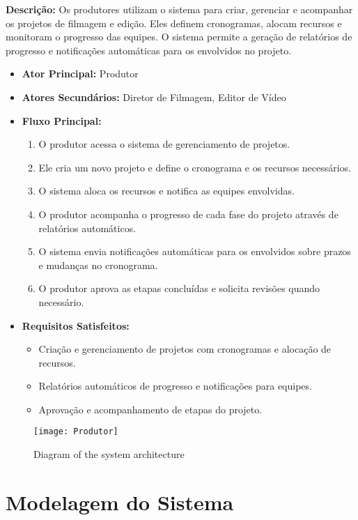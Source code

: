 \textbf{Descrição:} Os produtores utilizam o sistema para criar, gerenciar e acompanhar os projetos de filmagem e edição. Eles definem cronogramas, alocam recursos e monitoram o progresso das equipes. O sistema permite a geração de relatórios de progresso e notificações automáticas para os envolvidos no projeto.

\begin{itemize}
  \item \textbf{Ator Principal:} Produtor
  \item \textbf{Atores Secundários:} Diretor de Filmagem, Editor de Vídeo
  \item \textbf{Fluxo Principal:}
    \begin{enumerate}
      \item O produtor acessa o sistema de gerenciamento de projetos.
      \item Ele cria um novo projeto e define o cronograma e os recursos necessários.
      \item O sistema aloca os recursos e notifica as equipes envolvidas.
      \item O produtor acompanha o progresso de cada fase do projeto através de relatórios automáticos.
      \item O sistema envia notificações automáticas para os envolvidos sobre prazos e mudanças no cronograma.
      \item O produtor aprova as etapas concluídas e solicita revisões quando necessário.
    \end{enumerate}
  \item \textbf{Requisitos Satisfeitos:}
    \begin{itemize}
      \item Criação e gerenciamento de projetos com cronogramas e alocação de recursos.
      \item Relatórios automáticos de progresso e notificações para equipes.
      \item Aprovação e acompanhamento de etapas do projeto.
    \end{itemize}
\end{itemize}


\begin{figure}[ht]
    \centering
    \texttt{[image: Produtor]}
    \caption{Diagram of the system architecture}
    \label{fig:diagram1}
\end{figure}

\section{Modelagem do Sistema}


